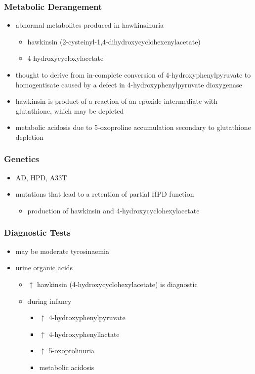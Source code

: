 \documentclass{scrartcl}
\begin{document}
\subsubsection{Metabolic Derangement}
\label{sec:org10a97b8}
\begin{itemize}
\item abnormal metabolites produced in hawkinsinuria
\begin{itemize}
\item hawkinsin (2-cysteinyl-1,4-dihydroxycyclohexenylacetate)
\item 4-hydroxycycloxylacetate
\end{itemize}
\item thought to derive from in-complete conversion of
4-hydroxyphenylpyruvate to homogentisate caused by a defect in
4-hydroxyphenylpyruvate dioxygenase
\end{itemize}
\begin{itemize}
\item hawkinsin is product of a reaction of an epoxide intermediate with
glutathione, which may be depleted
\item metabolic acidosis due to 5-oxoproline accumulation secondary to
glutathione depletion
\end{itemize}

\subsubsection{Genetics}
\label{sec:orgb509ff6}
\begin{itemize}
\item AD, HPD, A33T
\item mutations that lead to a retention of partial HPD function
\begin{itemize}
\item production of hawkinsin and 4-hydroxycyclohexylacetate
\end{itemize}
\end{itemize}
\subsubsection{Diagnostic Tests}
\label{sec:orgac24ba4}
\begin{itemize}
\item may be moderate tyrosinaemia
\item urine organic acids
\begin{itemize}
\item \(\uparrow\) hawkinsin (4-hydroxycyclohexylacetate) is diagnostic
\item during infancy
\begin{itemize}
\item \(\uparrow\) 4-hydroxyphenylpyruvate
\item \(\uparrow\) 4-hydroxyphenyllactate
\item \(\uparrow\) 5-oxoprolinuria
\item metabolic acidosis
\end{itemize}
\end{itemize}
\end{itemize}
\end{document}
